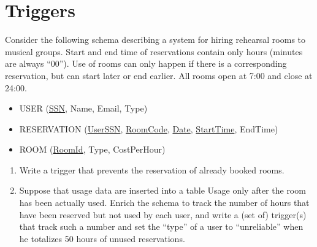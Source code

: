 \section{Triggers}

Consider the following schema describing a system for hiring rehearsal rooms to musical groups. 
Start and end time of reservations contain only hours (minutes are always “00”). 
Use of rooms can only happen if there is a corresponding reservation, but can start later or end earlier. 
All rooms open at 7:00 and close at 24:00.
\begin{itemize}
    \item USER (\underline{SSN}, Name, Email, Type)
    \item RESERVATION (\underline{UserSSN}, \underline{RoomCode}, \underline{Date}, \underline{StartTime}, EndTime)
    \item ROOM (\underline{RoomId}, Type, CostPerHour)
\end{itemize}
\begin{enumerate}
    \item Write a trigger that prevents the reservation of already booked rooms. 
    \item Suppose that usage data are inserted into a table Usage only after the room has been actually used. 
        Enrich the schema to track the number of hours that have been reserved but not used by each user, and write a (set of) trigger(s) that track such a number and set the “type” of a user to “unreliable” when he totalizes 50 hours of unused reservations.
\end{enumerate}

